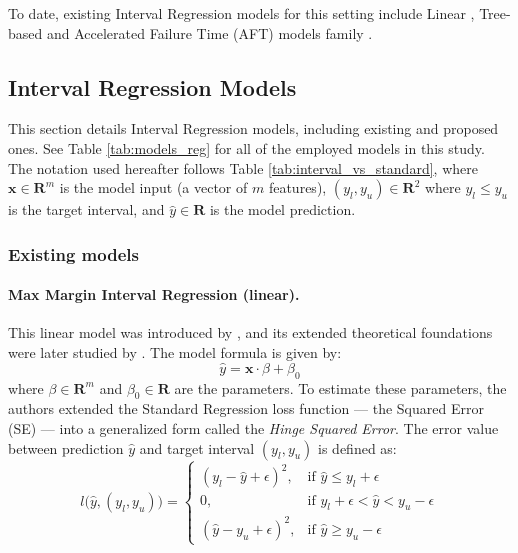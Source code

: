 \documentclass[12pt]{article}
\begin{document}
To date, existing Interval Regression models for this setting include Linear \citep{rigaill:13, rit,meMLP}, Tree-based \citep{mmit, aft_xgboost} and Accelerated Failure Time (AFT) models family \citep{aft_semi, aft, aft_huang2006regularized, aft_cai2009regularized}.



\subsection{Interval Regression Models} \label{sec:models}
This section details Interval Regression models, including existing and proposed ones. 
See Table \ref{tab:models_reg} for all of the employed models in this study.
The notation used hereafter follows Table \ref{tab:interval_vs_standard}, where $\mathbf{x} \in \mathbf{R}^m$ is the model input (a vector of $m$ features), $(y_l, y_u) \in \mathbf{R}^2$ where $y_l \leq y_u$ is the target interval, and $\hat{y} \in \mathbf{R}$ is the model prediction.

\subsubsection{Existing models}

\paragraph{Max Margin Interval Regression (linear).} This linear model was introduced by \citet{rigaill:13}, and its extended theoretical foundations were later studied by \citet{rit}.
The model formula is given by:
\begin{equation} \label{eq:linear_prediction}
    \hat{y} = \mathbf{x} \cdot \beta + \beta_0
\end{equation}
where $\beta \in \mathbf{R}^m$ and $\beta_0 \in \mathbf{R}$ are the parameters. To estimate these parameters, the authors extended the Standard Regression loss function — the Squared Error (SE) — into a generalized form called the \textit{Hinge Squared Error}.
The error value between prediction $\hat{y}$ and target interval $(y_l, y_u)$ is defined as: 
$$l\Big(\hat{y}, (y_l, y_u)\Big) = 
\begin{cases} 
    (y_l - \hat{y} + \epsilon)^2, & \mbox{if } \hat{y} \leq y_l + \epsilon \\
    0, & \mbox{if } y_l + \epsilon < \hat{y} < y_u - \epsilon \\
    (\hat{y} - y_u + \epsilon)^2, & \mbox{if } \hat{y} \geq y_u - \epsilon
\end{cases}$$
\end{document}
